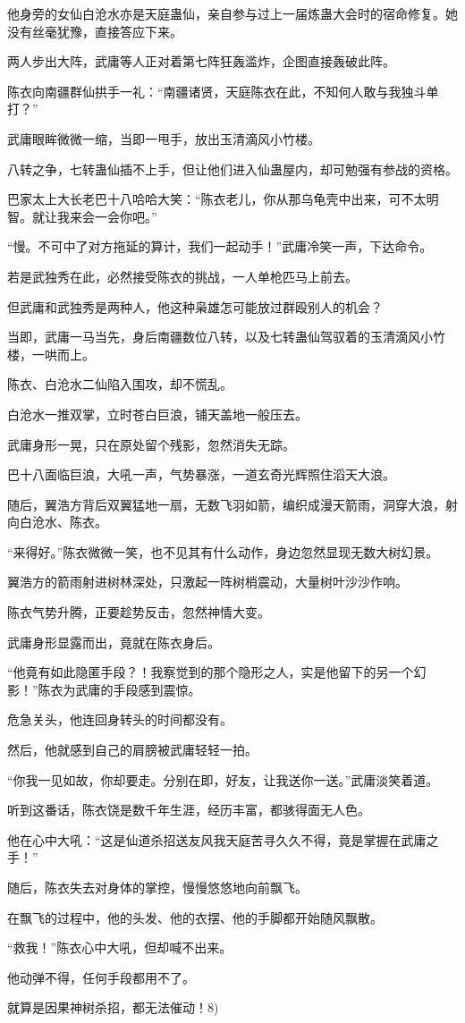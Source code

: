 \begin{this_body}
他身旁的女仙白沧水亦是天庭蛊仙，亲自参与过上一届炼蛊大会时的宿命修复。她没有丝毫犹豫，直接答应下来。

两人步出大阵，武庸等人正对着第七阵狂轰滥炸，企图直接轰破此阵。

陈衣向南疆群仙拱手一礼：“南疆诸贤，天庭陈衣在此，不知何人敢与我独斗单打？”

武庸眼眸微微一缩，当即一甩手，放出玉清滴风小竹楼。

八转之争，七转蛊仙插不上手，但让他们进入仙蛊屋内，却可勉强有参战的资格。

巴家太上大长老巴十八哈哈大笑：“陈衣老儿，你从那乌龟壳中出来，可不太明智。就让我来会一会你吧。”

“慢。不可中了对方拖延的算计，我们一起动手！”武庸冷笑一声，下达命令。

若是武独秀在此，必然接受陈衣的挑战，一人单枪匹马上前去。

但武庸和武独秀是两种人，他这种枭雄怎可能放过群殴别人的机会？

当即，武庸一马当先，身后南疆数位八转，以及七转蛊仙驾驭着的玉清滴风小竹楼，一哄而上。

陈衣、白沧水二仙陷入围攻，却不慌乱。

白沧水一推双掌，立时苍白巨浪，铺天盖地一般压去。

武庸身形一晃，只在原处留个残影，忽然消失无踪。

巴十八面临巨浪，大吼一声，气势暴涨，一道玄奇光辉照住滔天大浪。

随后，翼浩方背后双翼猛地一扇，无数飞羽如箭，编织成漫天箭雨，洞穿大浪，射向白沧水、陈衣。

“来得好。”陈衣微微一笑，也不见其有什么动作，身边忽然显现无数大树幻景。

翼浩方的箭雨射进树林深处，只激起一阵树梢震动，大量树叶沙沙作响。

陈衣气势升腾，正要趁势反击，忽然神情大变。

武庸身形显露而出，竟就在陈衣身后。

“他竟有如此隐匿手段？！我察觉到的那个隐形之人，实是他留下的另一个幻影！”陈衣为武庸的手段感到震惊。

危急关头，他连回身转头的时间都没有。

然后，他就感到自己的肩膀被武庸轻轻一拍。

“你我一见如故，你却要走。分别在即，好友，让我送你一送。”武庸淡笑着道。

听到这番话，陈衣饶是数千年生涯，经历丰富，都骇得面无人色。

他在心中大吼：“这是仙道杀招送友风我天庭苦寻久久不得，竟是掌握在武庸之手！”

随后，陈衣失去对身体的掌控，慢慢悠悠地向前飘飞。

在飘飞的过程中，他的头发、他的衣摆、他的手脚都开始随风飘散。

“救我！”陈衣心中大吼，但却喊不出来。

他动弹不得，任何手段都用不了。

就算是因果神树杀招，都无法催动！8)

\end{this_body}

